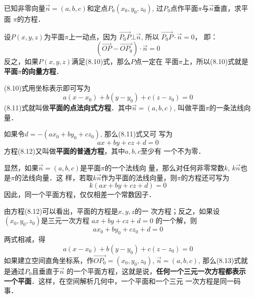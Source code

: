 已知非零向量$\vec{n}=(a,b,c)$和定点$P_0(x_0,y_0,z_0)$,
过$P_0$点作平面$\pi$与$\vec{n}$垂直，求平面
$\pi$的方程．

\begin{figure}[htp]
    \centering
{}
    \caption{}
\end{figure}

设$P(x,y,z)$为平面$\pi$上一动点，因为
$\Vec{P_0P}\bot\vec{n}$, 所以
$\Vec{P_0P}\cdot \vec{n}=0$，
即：
\begin{equation}
    \left(\Vec{OP}-\Vec{OP_0}\right)\cdot\vec{n}=0
\end{equation}
反之，如果$P(x,y,z)$满足(8.10)式，那么$P$点一定在
平面$\pi$上，所以(8.10)式就是\textbf{平面$\pi$的向量方程}．

(8.10)式用坐标表示即可写为
\begin{equation}
    a(x-x_0)+b(y-y_0)+c(z-z_0)=0
\end{equation}
(8.11)式就叫做\textbf{平面的点法向式方程}．其中$\vec{n}=(a,b,c)$, 
叫做平面$\pi$的一条法线向量．

如果令$d=-(ax_0+by_0+cz_0)$, 那么(8.11)式又可
写为
\begin{equation}
    ax+by+cz+d=0
\end{equation}
方程(8.12)又叫做\textbf{平面的普通方程}，其中$a,b,c$至少有
一个不为零．

显然，如果$\vec{n}=(a,b,c)$是平面$\pi$的一个法线向
量，那么对任何非零常数$k$, $k\vec{n}$也是$\pi$的法线向量．这
样，若取$k\vec{n}$作为平面的法线向量，则$\pi$的方程还可写为
\[k(ax+by+cz+d)=0\]
因此，同一个平面方程，仅仅相差一个常数因子．

由方程(8.12)可以看出，平面的方程是$x,y,z$的一
次方程；反之，如果设$(x_0,y_0,z_0)$是三元一次方程
$ax+by+cz+d=0$
的一个解，则
\[ax_0+by_0+cz_0+d=0\]
两式相减，得
\begin{equation}
    a(x-x_0)+b(y-y_0)+c(z-z_0)=0
\end{equation}
如果建立空间直角坐标系，作$\Vec{OP_0}=(x_0,y_0,z_0)$,
 $\vec{n}=(a,b,c)$, 那么(8.13)式就是通过$P_0$且垂直于$\vec{n}$
的一个平面方程，这就是说，\textbf{任何一个三元一次方程都表示
一个平面}．这样，在空间解析几何中，一个平面和一个三元
一次方程是同一码事．

